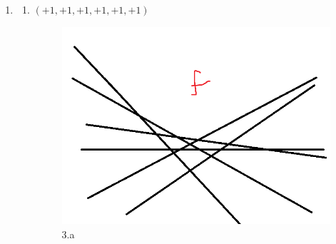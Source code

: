 \documentclass[11pt]{article}
\begin{document}
\begin{enumerate}
    \item 
    \begin{enumerate}
        \item $(+1, +1, +1, +1, +1, +1)$
        
        \begin{figure}[H]
            \centering
            \includegraphics[scale = 0.25]{3_1_a.png}
            \caption{3.a}
        \end{figure}


\end{enumerate}
\end{enumerate}
\end{document}
